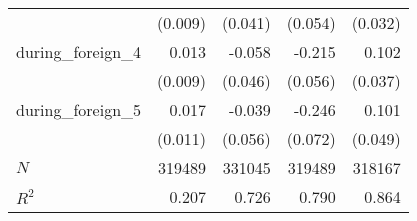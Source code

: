 {\begin{tabular}{l*{4}{D{.}{.}{-1}}}
            &     (0.009)         &     (0.041)         &     (0.054)         &     (0.032)         \\
[1em]
during\_foreign\_4&       0.013         &      -0.058         &      -0.215\sym{***}&       0.102\sym{***}\\
            &     (0.009)         &     (0.046)         &     (0.056)         &     (0.037)         \\
[1em]
during\_foreign\_5&       0.017         &      -0.039         &      -0.246\sym{***}&       0.101\sym{**} \\
            &     (0.011)         &     (0.056)         &     (0.072)         &     (0.049)         \\
\hline
\(N\)       &      319489         &      331045         &      319489         &      318167         \\
\(R^{2}\)   &       0.207         &       0.726         &       0.790         &       0.864         \\
\hline\hline
\end{tabular}
}
